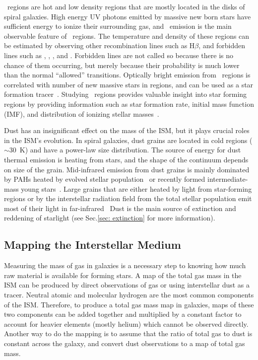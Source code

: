 \hii~regions are hot and low density regions that are mostly located in the disks of spiral galaxies.
High energy UV photons emitted by massive new born stars have sufficient energy to ionize their surrounding gas, and
~\halpha emission is the main observable feature of \hii~regions.
The temperature and density of these regions can be estimated by observing other recombination lines such as H$\beta$, and forbidden lines such as \sii, \oii, \oiii, and \nii. 
Forbidden lines are not called so because there is no chance of them occurring, but merely because their probability is much lower than the normal ``allowed'' transitions.
Optically bright \halpha emission from \hii~regions is correlated with number of new massive stars in regions, and can be used as a star formation tracer~\citep[e.g.][]{Kennicutt98b,Calzetti13}.
Studying \hii~regions provides valuable insight into star forming regions by providing information such as star formation rate, initial mass function (IMF), and distribution of ionizing stellar masses~\citep[][and references therein]{Azimlu11}.


Dust has an insignificant effect on the mass of the ISM, but it plays crucial roles in the ISM's evolution.
In spiral galaxies, dust grains are located in cold regions ($\sim$30~K) and have a power-law size distribution.
The source of energy for dust thermal emission is heating from stars, and the shape of the continuum depends on size of the grain.
Mid-infrared emission from dust grains is mainly dominated by PAHs heated by evolved stellar population~\cite{Smith07a} or recently formed intermediate-mass young stars~\cite{Peeters04}. %
Large grains that are either heated by light from star-forming regions or by the interstellar radiation field from the total stellar population emit most of their light in far-infrared~\citep[e.g.][]{Calapa14, lu14}
Dust is the main source of extinction and reddening of starlight (see Sec.\ref{sec: extinction} for more information).

\subsection{Mapping the Interstellar Medium} 
\label{sec: ismmap}
Measuring the mass of gas in galaxies is a necessary step to knowing how much raw material is available for forming stars.
A map of the total gas mass in the ISM can be produced by direct observations of gas or using interstellar dust as a tracer. 
Neutral atomic and molecular hydrogen are the most common components of the ISM. 
Therefore, to produce a total gas mass map in galaxies, maps of these two components can be added together and multiplied by a constant factor to account for heavier elements (mostly helium) which cannot be observed directly. 
Another way to do the mapping is to assume that the ratio of total gas to dust is constant across the galaxy, and convert dust observations to a map of total gas mass.

